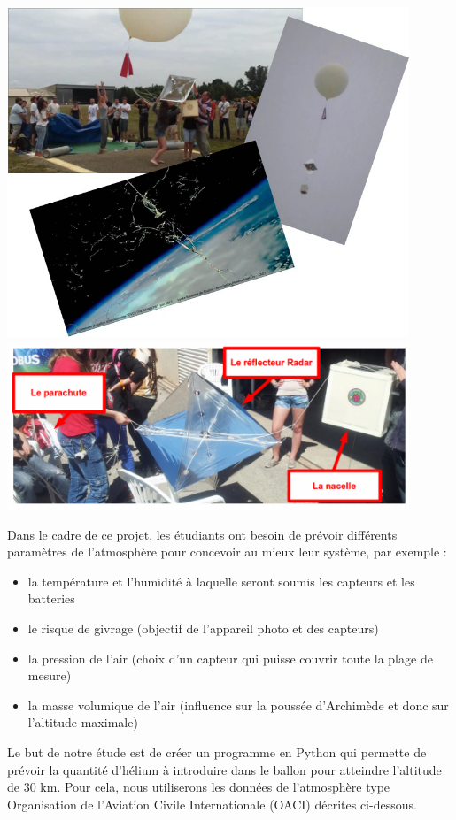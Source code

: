 \documentclass[10pt]{article}
\begin{document}
\begin{center}
\includegraphics[width=12cm]{images/solarpi3.jpg}\\
\includegraphics[width=12cm]{images/solarpi1.png}
\end{center}


Dans le cadre de ce projet, les étudiants ont besoin de prévoir différents paramètres de l'atmosphère pour concevoir au mieux leur système, par exemple :
\begin{itemize}
\item la température et l'humidité à laquelle seront soumis les capteurs et les batteries
\item le risque de givrage (objectif de l'appareil photo et des capteurs)
\item la pression de l'air (choix d'un capteur qui puisse couvrir toute la plage de mesure)
\item la masse volumique de l'air (influence sur la poussée d'Archimède et donc sur l'altitude maximale)
\end{itemize}

\begin{obj}

Le but de notre étude est de créer un programme en Python qui permette de prévoir la quantité d'hélium à introduire dans le ballon pour atteindre l'altitude de 30 km. Pour cela, nous utiliserons les données de l'atmosphère type Organisation de l'Aviation Civile Internationale (OACI) décrites ci-dessous.

\end{obj}
\end{document}
